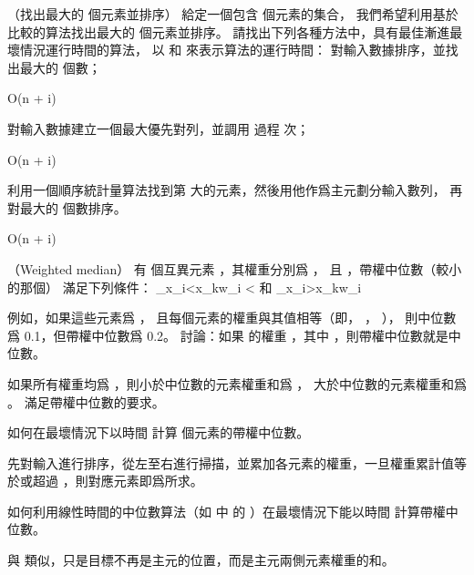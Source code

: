 \startsubject[
  title={Problems},
]

\startPROBLEM
（找出最大的  個元素並排序）
給定一個包含  個元素的集合，
我們希望利用基於比較的算法找出最大的  個元素並排序。
請找出下列各種方法中，具有最佳漸進最壞情況運行時間的算法，
以  和  來表示算法的運行時間：
\startigBase[a]
\startitem
對輸入數據排序，並找出最大的  個數；
\stopitem

\startANSWER
\startformula
O(n + i)
\stopformula
\stopANSWER

\startitem
對輸入數據建立一個最大優先對列，並調用  過程  次；
\stopitem

\startANSWER
\startformula
O(n + i)
\stopformula
\stopANSWER

\startitem
利用一個順序統計量算法找到第  大的元素，然後用他作爲主元劃分輸入數列，
再對最大的  個數排序。
\stopitem

\startANSWER
\startformula
O(n + i)
\stopformula
\stopANSWER
\stopigBase
\stopPROBLEM

\startPROBLEM
（Weighted median）
有  個互異元素 ，其權重分別爲 ，
且 ，{\EMP 帶權中位數}（較小的那個）  滿足下列條件：
\startformula
\sum_{x_i<x_k}w_i < 
\stopformula
和
\startformula
\sum_{x_i>x_k}w_i \le {}
\stopformula

例如，如果這些元素爲 ，
且每個元素的權重與其值相等（即， ， ），
則中位數爲 0.1，但帶權中位數爲 0.2。
\startigBase[a]
\startitem
討論：如果  的權重 ，其中 ，則帶權中位數就是中位數。
\stopitem

\startANSWER
如果所有權重均爲 ，則小於中位數的元素權重和爲 ，
大於中位數的元素權重和爲 。
滿足帶權中位數的要求。
\stopANSWER

\startitem
如何在最壞情況下以時間  計算  個元素的帶權中位數。
\stopitem

\startANSWER
先對輸入進行排序，從左至右進行掃描，並累加各元素的權重，一旦權重累計值等於或超過 ，則對應元素即爲所求。
\stopANSWER

\startitem
如何利用線性時間的中位數算法（如 中
的 ）在最壞情況下能以時間  計算帶權中位數。
\stopitem

\startANSWER
與  類似，只是目標不再是主元的位置，而是主元兩側元素權重的和。
\stopANSWER
\stopigBase

